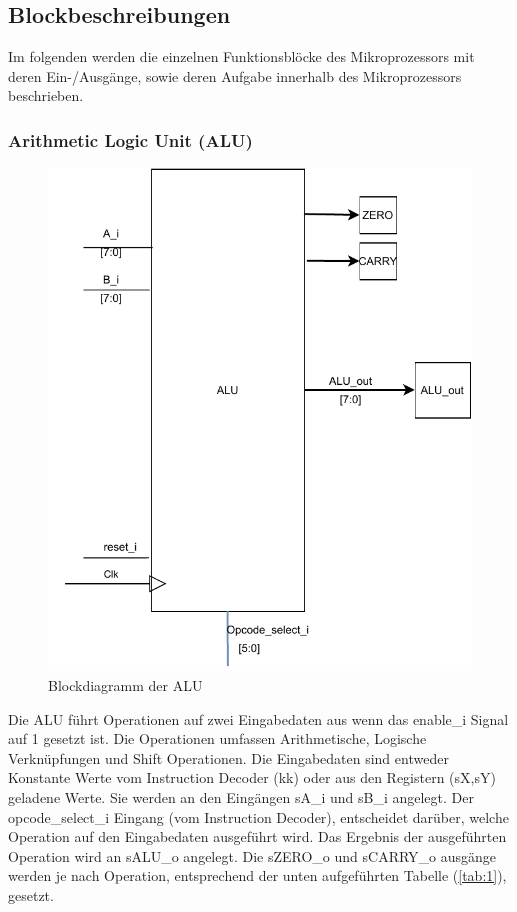 \documentclass{scrartcl}
\begin{document}
\subsection{Blockbeschreibungen}
Im folgenden werden die einzelnen Funktionsblöcke des Mikroprozessors mit deren Ein-/Ausgänge, sowie deren Aufgabe innerhalb des Mikroprozessors beschrieben.


\subsubsection{Arithmetic Logic Unit (ALU)}
\begin{figure}[H]
    \centering
    \includegraphics[width=\textwidth]{ALU_beschreibung.pdf}
    \caption{Blockdiagramm der ALU}
    \label{fig:Block_ALU}
\end{figure}

Die ALU führt Operationen auf zwei Eingabedaten aus wenn das enable\_i Signal auf 1 gesetzt ist. Die Operationen umfassen Arithmetische, Logische Verknüpfungen und Shift Operationen. Die Eingabedaten sind entweder Konstante Werte vom Instruction Decoder (kk) oder aus den Registern (sX,sY) geladene Werte. Sie werden an den Eingängen sA\_i und sB\_i angelegt. Der opcode\_select\_i Eingang (vom Instruction Decoder), entscheidet darüber, welche Operation auf den Eingabedaten ausgeführt wird. Das Ergebnis der ausgeführten Operation wird an sALU\_o angelegt.
Die sZERO\_o und sCARRY\_o ausgänge werden je nach Operation, entsprechend der unten aufgeführten Tabelle (\ref{tab:1}), gesetzt.
\end{document}

